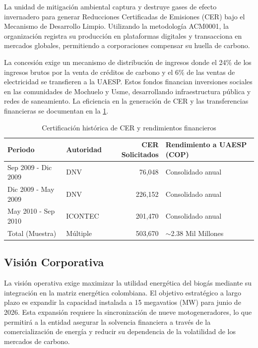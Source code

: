 \documentclass[11pt,letterpaper]{article}
\begin{document}
La unidad de mitigación ambiental captura y destruye gases de efecto invernadero
para generar Reducciones Certificadas de Emisiones (CER) bajo el Mecanismo de
Desarrollo Limpio. Utilizando la metodología ACM0001, la organización registra
su producción en plataformas digitales y transacciona en mercados globales,
permitiendo a corporaciones compensar su huella de carbono.

La concesión exige un mecanismo de distribución de ingresos donde el 24\% de los
ingresos brutos por la venta de créditos de carbono y el 6\% de las ventas de
electricidad se transfieren a la UAESP. Estos fondos financian inversiones
sociales en las comunidades de Mochuelo y Usme, desarrollando infraestructura
pública y redes de saneamiento. La eficiencia en la generación de CER y las
transferencias financieras se documentan en la \cref{tab:cer_audit}.

\begin{table}[htbp]
  \centering
  \caption{Certificación histórica de CER y rendimientos financieros}
    \label{tab:cer_audit}
  \begin{tabular}{llrl}
    \toprule Periodo & Autoridad & CER Solicitados & Rendimiento a UAESP (COP)
    \\
    \midrule
    Sep 2009 - Dic 2009 & DNV & 76,048 & Consolidado anual \\
    Dic 2009 - May 2009 & DNV & 226,152 & Consolidado anual \\
    May 2010 - Sep 2010 & ICONTEC & 201,470 & Consolidado anual \\
    \midrule
    Total (Muestra) & Múltiple & 503,670 & $\sim$2.38 Mil Millones \\
    \bottomrule
  \end{tabular}
\end{table}

\subsection{Visión Corporativa}

La visión operativa exige maximizar la utilidad energética del biogás mediante
su integración en la matriz energética colombiana. El objetivo estratégico a
largo plazo es expandir la capacidad instalada a 15 megavatios (MW) para junio
de 2026. Esta expansión requiere la sincronización de nueve motogeneradores, lo
que permitirá a la entidad asegurar la solvencia financiera a través de la
comercialización de energía y reducir su dependencia de la volatilidad de los
mercados de carbono.
\end{document}
